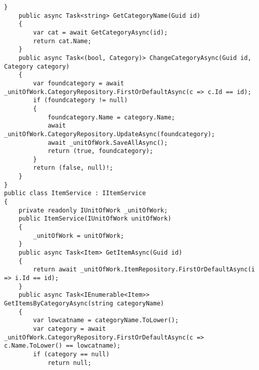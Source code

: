 \begin{lstlisting}[style=csharpinlinestyle]
    }
    public async Task<string> GetCategoryName(Guid id)
    {
        var cat = await GetCategoryAsync(id);
        return cat.Name;
    }
    public async Task<(bool, Category)> ChangeCategoryAsync(Guid id, Category category)
    {
        var foundcategory = await _unitOfWork.CategoryRepository.FirstOrDefaultAsync(c => c.Id == id);
        if (foundcategory != null)
        {
            foundcategory.Name = category.Name;
            await _unitOfWork.CategoryRepository.UpdateAsync(foundcategory);
            await _unitOfWork.SaveAllAsync();
            return (true, foundcategory);
        }
        return (false, null)!;
    }
}
public class ItemService : IItemService
{
    private readonly IUnitOfWork _unitOfWork;
    public ItemService(IUnitOfWork unitOfWork)
    {
        _unitOfWork = unitOfWork;
    }
    public async Task<Item> GetItemAsync(Guid id)
    {
        return await _unitOfWork.ItemRepository.FirstOrDefaultAsync(i => i.Id == id);
    }
    public async Task<IEnumerable<Item>> GetItemsByCategoryAsync(string categoryName)
    {
        var lowcatname = categoryName.ToLower();
        var category = await _unitOfWork.CategoryRepository.FirstOrDefaultAsync(c => c.Name.ToLower() == lowcatname);
        if (category == null)
            return null;


\end{lstlisting}
